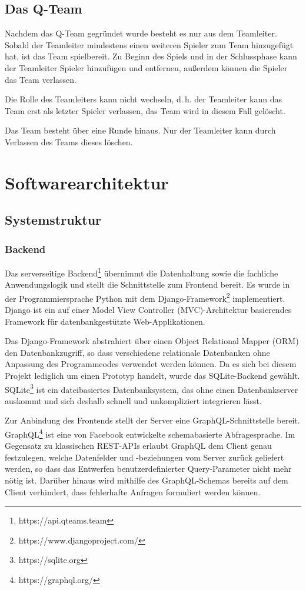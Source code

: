 \documentclass[a4paper,11pt,listof=numbered,glossary=totoc,parskip=half,toc=bib]{scrreprt}
\newcommand{\dash}{\mbox{d.\,h.}\xspace}
\begin{document}
	\section{Das Q-Team}
	Nachdem das Q-Team gegründet wurde besteht es nur aus dem Teamleiter. Sobald der Teamleiter mindestens einen weiteren Spieler zum Team hinzugefügt hat, ist das Team spielbereit. Zu Beginn des Spiels und in der Schlussphase kann der Teamleiter Spieler hinzufügen und entfernen, außerdem können die Spieler das Team verlassen.
	
	Die Rolle des Teamleiters kann nicht wechseln, \dash der Teamleiter kann das Team erst als letzter Spieler verlassen, das Team wird in diesem Fall gelöscht.
	
	Das Team besteht über eine Runde hinaus. Nur der Teamleiter kann durch Verlassen des Teams dieses löschen.
	
	\chapter{Softwarearchitektur}
	\section{Systemstruktur}
		\subsection{Backend}
	\label{subsec:backend}
	Das serverseitige Backend\footnote{https://api.qteams.team} übernimmt die Datenhaltung sowie die fachliche Anwendungslogik und stellt die Schnittstelle zum Frontend bereit. Es wurde in der Programmiersprache Python mit dem Django-Framework\footnote{https://www.djangoproject.com/} implementiert. Django ist ein auf einer \frqq{}Model View Controller (MVC)\flqq{}-Architektur basierendes Framework für datenbankgestützte Web-Applikationen.
	
	Das Django-Framework abstrahiert über einen Object Relational Mapper (ORM) den Datenbankzugriff, so dass verschiedene relationale Datenbanken ohne Anpassung des Programmcodes verwendet werden können. Da es sich bei diesem Projekt lediglich um einen Prototyp handelt, wurde das SQLite-Backend gewählt. SQLite\footnote{https://sqlite.org} ist ein dateibasiertes Datenbanksystem, das ohne einen Datenbankserver auskommt und sich deshalb schnell und unkompliziert integrieren lässt.
	
	Zur Anbindung des Frontends stellt der Server eine GraphQL-Schnittstelle bereit. GraphQL\footnote{https://graphql.org/} ist eine von Facebook entwickelte schemabasierte Abfragesprache. Im Gegensatz zu klassischen REST-APIs erlaubt GraphQL dem Client genau festzulegen, welche Datenfelder und -beziehungen vom Server zurück geliefert werden, so dass das Entwerfen benutzerdefinierter Query-Parameter nicht mehr nötig ist. Darüber hinaus wird mithilfe des GraphQL-Schemas bereits auf dem Client verhindert, dass fehlerhafte Anfragen formuliert werden können.
	
\end{document}

